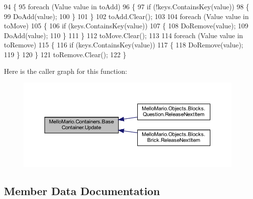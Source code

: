 \begin{DoxyCode}
94         \{
95             \textcolor{keywordflow}{foreach} (Value value \textcolor{keywordflow}{in} toAdd)
96             \{
97                 \textcolor{keywordflow}{if} (!keys.ContainsKey(value))
98                 \{
99                     DoAdd(value);
100                 \}
101             \}
102             toAdd.Clear();
103 
104             \textcolor{keywordflow}{foreach} (Value value \textcolor{keywordflow}{in} toMove)
105             \{
106                 \textcolor{keywordflow}{if} (keys.ContainsKey(value))
107                 \{
108                     DoRemove(value);
109                     DoAdd(value);
110                 \}
111             \}
112             toMove.Clear();
113 
114             \textcolor{keywordflow}{foreach} (Value value \textcolor{keywordflow}{in} toRemove)
115             \{
116                 \textcolor{keywordflow}{if} (keys.ContainsKey(value))
117                 \{
118                     DoRemove(value);
119                 \}
120             \}
121             toRemove.Clear();
122         \}
\end{DoxyCode}
Here is the caller graph for this function\+:
\nopagebreak
\begin{figure}[H]
\begin{center}
\leavevmode
\includegraphics[width=350pt]{classMelloMario_1_1Containers_1_1BaseContainer_af04d91bc235e61367a9226814b8966e3_icgraph}
\end{center}
\end{figure}


\subsection{Member Data Documentation}
\mbox{\label{classMelloMario_1_1Containers_1_1BaseContainer_a0c7e4bb23d6b054dacc7c54e963d7d96}} 
